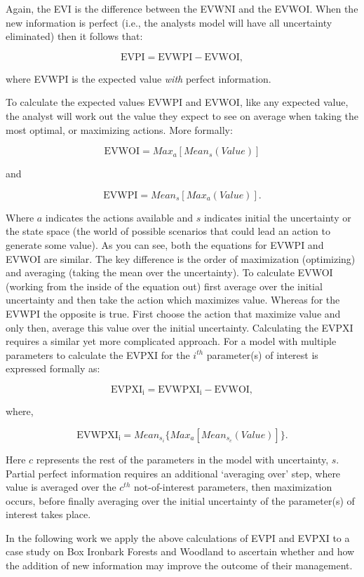 \documentclass[]{article}
\begin{document}
Again, the EVI is the difference between the EVWNI and the EVWOI. When
the new information is perfect (i.e., the analysts model will have all
uncertainty eliminated) then it follows that:

\[ \mathrm{EVPI} = \mathrm{EVWPI} - \mathrm{EVWOI}, \]

where EVWPI is the expected value \emph{with} perfect information.

To calculate the expected values EVWPI and EVWOI, like any expected
value, the analyst will work out the value they expect to see on average
when taking the most optimal, or maximizing actions. More formally:

\[ \mathrm{EVWOI} = Max_{a}[Mean_{s}(Value)] \]

and

\[ \mathrm{EVWPI} = Mean_{s}[Max_{a}(Value)]. \]

Where \(a\) indicates the actions available and \(s\) indicates initial
the uncertainty or the state space (the world of possible scenarios that
could lead an action to generate some value). As you can see, both the
equations for EVWPI and EVWOI are similar. The key difference is the
order of maximization (optimizing) and averaging (taking the mean over
the uncertainty). To calculate EVWOI (working from the inside of the
equation out) first average over the initial uncertainty and then take
the action which maximizes value. Whereas for the EVWPI the opposite is
true. First choose the action that maximize value and only then, average
this value over the initial uncertainty. Calculating the EVPXI requires
a similar yet more complicated approach. For a model with multiple
parameters to calculate the EVPXI for the \(i^{th}\) parameter(s) of
interest is expressed formally as:

\[ \mathrm{EVPXI_i} = \mathrm{EVWPXI_i} - \mathrm{EVWOI}, \]

where,

\[ \mathrm{EVWPXI_i} = Mean_{s_i}\{Max_{a}[Mean_{s_c}(Value)]\}. \]

Here \(c\) represents the rest of the parameters in the model with
uncertainty, \(s\). Partial perfect information requires an additional
`averaging over' step, where value is averaged over the \(c^{th}\)
not-of-interest parameters, then maximization occurs, before finally
averaging over the initial uncertainty of the parameter(s) of interest
takes place.

In the following work we apply the above calculations of EVPI and EVPXI
to a case study on Box Ironbark Forests and Woodland to ascertain
whether and how the addition of new information may improve the outcome
of their management.
\end{document}
